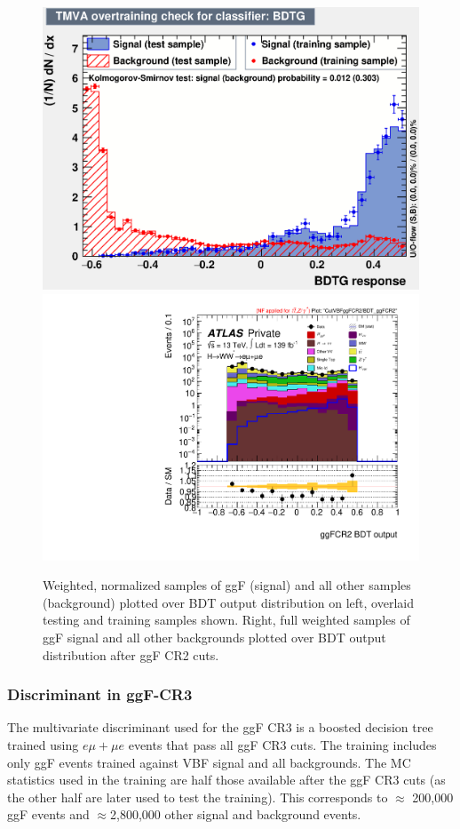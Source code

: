 \begin{figure}[!htbp]
\centering
  \includegraphics[width=.45\linewidth]{Pictures/ggFCR2/overtrain_BDTG.eps}
  \includegraphics[width=.35\linewidth]{Pictures/run2-emme-CutVBFggFCR2-BDT_ggFCR2-log.pdf}
\caption{Weighted, normalized samples of ggF (signal) and all other samples (background) plotted over BDT output distribution on left, overlaid testing and training samples shown. Right, full weighted samples of ggF signal and all other backgrounds plotted over BDT output distribution after ggF CR2 cuts.}
\label{fig:ggFCR2BDTresult}
\end{figure}

\subsubsection{Discriminant in ggF-CR3}

The multivariate discriminant used for the ggF CR3 is a boosted decision tree trained using $e\mu+\mu e$ events that pass all ggF CR3 cuts. The training includes only ggF events trained against VBF signal and all backgrounds. The MC statistics used in the training are half those available after the ggF CR3 cuts (as the other half are later used to test the training). This corresponds to $\approx$ 200,000 ggF events and $\approx$2,800,000 other signal and background events.

